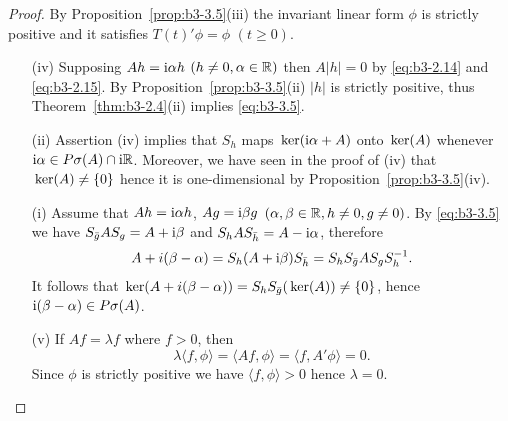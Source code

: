 \begin{proof}
	By Proposition~\ref{prop:b3-3.5}(iii) the invariant linear form $\phi$ is strictly positive and it satisfies $T(t)'\phi = \phi$ $(t \geq 0)$.
	\begin{enumerate}[wide, labelindent=.5em]
	\item[(iv)] 
	Supposing $Ah = \mathrm{i}\alpha h$ $(h \neq 0, \alpha \in \mathbb{R})$ then $A|h| = 0$ by \eqref{eq:b3-2.14} and \eqref{eq:b3-2.15}.
	By Proposition~\ref{prop:b3-3.5}(ii) $|h|$ is strictly positive, thus Theorem~\ref{thm:b3-2.4}(ii) implies \eqref{eq:b3-3.5}.
	
	\item[(ii)] 
	Assertion (iv) implies that $S_{h}$ maps $\mathop{}\mathrm{ker}(\mathrm{i}\alpha + A)$ onto $\mathop{}\mathrm{ker}(A)$ whenever $\mathrm{i} \alpha \in P\sigma(A)\cap \mathrm{i}\mathbb{R}$.
	Moreover, we have seen in the proof of (iv) that $\mathop{}\mathrm{ker}(A) \neq \{0\}$ hence it is one-dimensional by Proposition~\ref{prop:b3-3.5}(iv).
	
	\item[(i)] 
	Assume that $Ah = \mathrm{i}\alpha h$, $Ag = \mathrm{i}\beta g$ $(\alpha,\beta \in \mathbb{R}, h \neq 0, g \neq 0)$.
	By \eqref{eq:b3-3.5} we have $S_{\bar{g}}A S_{g} = A + \mathrm{i}\beta$ and $S_{h}A S_{\bar{h}} = A - \mathrm{i}\alpha$, therefore
	\begin{equation}\label{eq:b3-3.6}
	A + i(\beta - \alpha) = S_{h}(A + \mathrm{i}\beta)S_{\bar{h}} = S_{h}S_{\bar{g}}A S_{g}S_{h}^{-1}.
	\end{equation}
	It follows that $\mathop{}\mathrm{ker}(A + i(\beta - \alpha)) = S_{h}S_{\bar{g}}(\mathop{}\mathrm{ker}(A)) \neq \{0\}$, hence $\mathrm{i} (\beta - \alpha) \in P\sigma(A)$.
	
	\item[(v)] 
	If $Af = \lambda f$ where $f > 0$, then
	\begin{equation}\label{eq:b3-3.7}
	\lambda\langle f,\phi\rangle = \langle Af,\phi\rangle = \langle f,A'\phi\rangle = 0.
	\end{equation}
	Since $\phi$ is strictly positive we have $\langle f,\phi\rangle > 0$ hence $\lambda = 0$.
	

\end{enumerate}
\end{proof}
